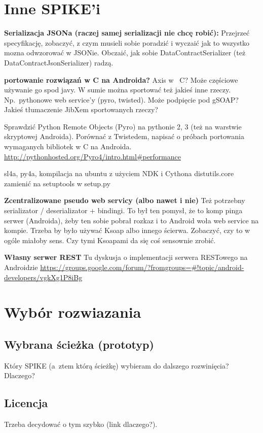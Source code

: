 \section{Inne SPIKE'i}

\textbf{Serializacja JSONa (raczej samej serializacji nie chcę robić):}
Przejrzeć specyfikację, zobaczyć, z czym musieli sobie poradzić i wyczaić jak to wszystko mozna odwzorować w JSONie. Obczaić, jak sobie DataContractSerializer (też DataContractJsonSerializer) radzą.

\textbf{portowanie rozwiązań w C na Androida?}
Axis w~ C? Może częściowe używanie go spod javy. W sumie można sportować też jakieś inne rzeczy. Np.\ pythonowe web service'y (pyro, twisted). Może podpięcie pod gSOAP? Jakieś tłumaczenie JibXem sportowanych rzeczy?

Sprawdzić Python Remote Objects (Pyro) na pythonie 2, 3 (też na warstwie skryptowej Androida). Porównać z Twistedem, napisać o próbach portowania wymaganych bibliotek w C na Androida. \url{http://pythonhosted.org/Pyro4/intro.html#performance}

sl4a, py4a, kompilacja na ubuntu z użyciem NDK i Cythona
distutils.core zamienić na setuptools w setup.py

\textbf{Zcentralizowane pseudo web servicy (albo nawet i nie)}
Też potrzebny serializator / deserializator + bindingi. To był ten pomysł, że to komp pinga serwer (Androida), żeby ten sobie pobrał rozkaz i to Android woła web service na kompie. Trzeba by było używać Ksoap albo innego ścierwa. Zobaczyć, czy to w ogóle miałoby sens. Czy tymi Ksoapami da się coś sensownie zrobić.

\textbf{Własny serwer REST}
Tu dyskusja o implementacji serwera RESTowego na Androidzie \url{https://groups.google.com/forum/?fromgroups=#!topic/android-developers/vgkXg1P8iBg}





\section{Wybór rozwiazania}
\subsection{Wybrana ścieżka (prototyp)}
Który SPIKE (a~ztem którą ścieżkę) wybieram do dalszego rozwinięcia?
Dlaczego?

\subsection{Licencja}
Trzeba decydować o tym szybko (link dlaczego?).

